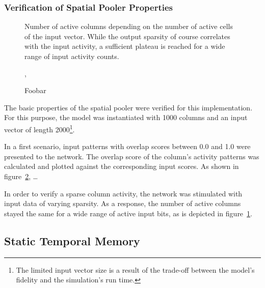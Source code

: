 \subsubsection{Verification of Spatial Pooler Properties}

\begin{figure}
	\begin{center}
		
	\end{center}
	\caption{Number of active columns depending on the number of active cells of the input vector. While the output sparsity of course correlates with the input activity, a sufficient plateau is reached for a wide range of input activity counts.}
	\label{fig:static_spatial_pooler_sparsity}
\end{figure}

\begin{figure}
	\begin{center}
		
	\end{center}
	\caption{Foobar},

	\label{fig:static_spatial_pooler_overlap}
\end{figure}

The basic properties of the spatial pooler were verified for this implementation. For this purpose, the model was instantiated with 1000 columns and an input vector of length 2000\footnote{The limited input vector size is a result of the trade-off between the model's fidelity and the simulation's run time.}.

In a first scenario, input patterns with overlap scores between 0.0 and 1.0 were presented to the network. The overlap score of the column's activity patterns was calculated and plotted against the corresponding input scores. As shown in figure~\ref{fig:static_spatial_pooler_overlap}, …

In order to verify a sparse column activity, the network was stimulated with input data of varying sparsity. As a response, the number of active columns stayed the same for a wide range of active input bits, as is depicted in figure~\ref{fig:static_spatial_pooler_sparsity}.

\subsection{Static Temporal Memory}

